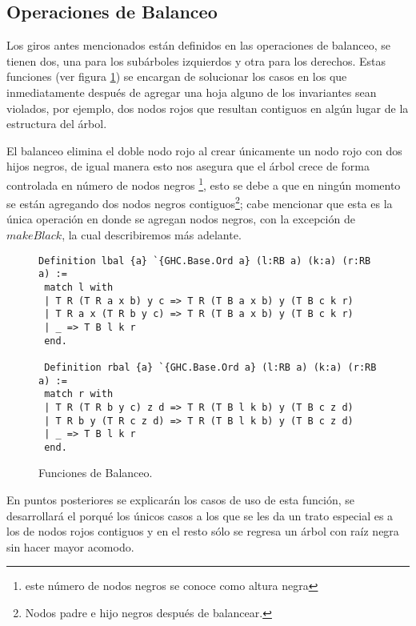 \subsection{Operaciones de Balanceo}
Los giros antes mencionados están definidos en las operaciones de balanceo, se tienen dos, una para
los subárboles izquierdos y otra para los derechos. Estas funciones (ver figura \ref{func_balanceo})
se encargan de solucionar los casos en los que inmediatamente después de agregar una hoja alguno de 
los invariantes sean violados, por ejemplo, dos nodos rojos que resultan contiguos en algún lugar 
de la estructura del \'arbol.

El balanceo elimina el doble nodo rojo al crear \'unicamente un nodo rojo con dos hijos negros, de igual
manera esto nos asegura que el árbol crece de forma controlada en n\'umero de nodos negros
\footnote{este n\'umero de nodos negros se conoce como altura negra}, esto se debe a que en ningún
momento se están agregando dos nodos negros contiguos\footnote{Nodos padre e hijo negros después de
balancear.}; cabe mencionar que esta es la única operación en donde se agregan nodos negros, con la
excepción de $makeBlack$, la cual describiremos m\'as adelante.

\begin{figure}
\centering
\captionsetup{justification=centering}
\begin{verbatim}
Definition lbal {a} `{GHC.Base.Ord a} (l:RB a) (k:a) (r:RB a) :=
 match l with
 | T R (T R a x b) y c => T R (T B a x b) y (T B c k r)
 | T R a x (T R b y c) => T R (T B a x b) y (T B c k r)
 | _ => T B l k r
 end.

 Definition rbal {a} `{GHC.Base.Ord a} (l:RB a) (k:a) (r:RB a) :=
 match r with
 | T R (T R b y c) z d => T R (T B l k b) y (T B c z d)
 | T R b y (T R c z d) => T R (T B l k b) y (T B c z d)
 | _ => T B l k r
 end.
\end{verbatim}
\caption{Funciones de Balanceo.}
\label{func_balanceo}
\end{figure}

En puntos posteriores se explicar\'an los casos de uso de esta función, se desarrollar\'a el porqu\'e los
\'unicos casos a los que se les da un trato especial es a los de nodos rojos contiguos y en el
resto s\'olo se regresa un \'arbol con ra\'iz negra sin hacer mayor acomodo.

